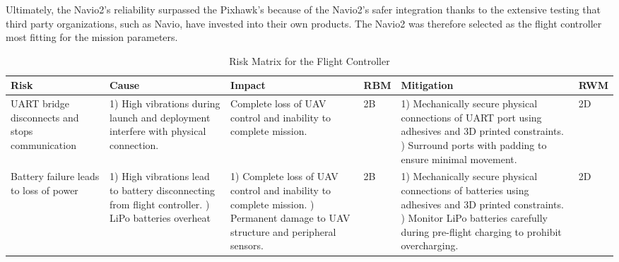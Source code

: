 		Ultimately, the Navio2’s reliability surpassed the Pixhawk’s because of the Navio2’s safer integration thanks to the extensive testing that third party organizations, such as Navio, have invested into their own products. The Navio2 was therefore selected as the flight controller most fitting for the mission parameters. 
		\begin{table}[H]
            \label{Flight Controller}
            {\footnotesize
            \caption{Risk Matrix for the Flight Controller}
            \centering
            \begin{tabularx}{\linewidth}{XXXlXl}
            \toprule
            \textbf{Risk}                                            & \textbf{Cause}                                                                                                                 & \textbf{Impact}                                                                                                                           & \textbf{RBM}  & \textbf{Mitigation}                                                                                                                                                                                     & \textbf{RWM} \\
            \midrule
            UART bridge disconnects and stops communication & 1) High vibrations during launch and deployment interfere with physical connection.                                  & Complete loss of UAV control and inability to complete mission.                                                                 & \cellcolor{red!25} 2B  & 1) Mechanically secure physical connections of UART port using adhesives and 3D printed constraints. \newline 2) Surround ports with padding to ensure minimal movement.                               & \cellcolor{orange!25} 2D  \\
            Battery failure leads to loss of power          & 1) High vibrations lead to battery disconnecting from flight controller. \newline 2) LiPo batteries overheat                   & 1) Complete loss of UAV control and inability to complete mission. \newline 2) Permanent damage to UAV structure and peripheral sensors. & \cellcolor{red!25} 2B  & 1) Mechanically secure physical connections of batteries using adhesives and 3D printed constraints. \newline 2) Monitor LiPo batteries carefully during pre-flight charging to prohibit overcharging. & \cellcolor{orange!25} 2D  \\

\end{tabularx}}
\end{table}
